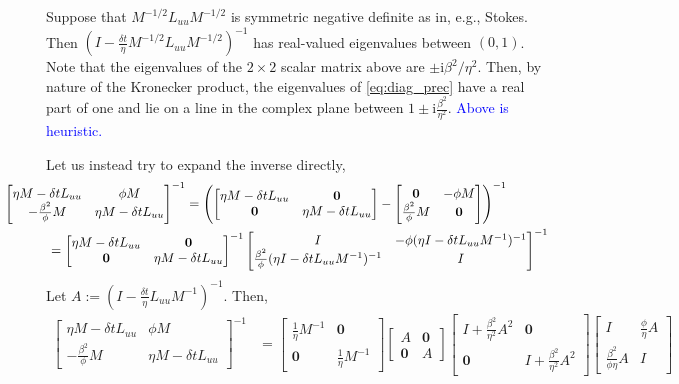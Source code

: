\documentclass[a4paper,10pt]{article}
\newcommand{\tcb}{\textcolor{blue}}
\begin{document}
%
Suppose that $M^{-1/2}L_{uu}M^{-1/2}$ is symmetric negative definite as in, e.g., Stokes.
Then $( I - \tfrac{\delta t}{\eta} M^{-1/2}L_{uu}M^{-1/2})^{-1}$ has real-valued
eigenvalues between $(0,1)$. Note that the eigenvalues of the $2\times 2$ scalar
matrix above are $\pm\mathrm{i}\beta^2/\eta^2$. Then, by nature of the Kronecker product,
the eigenvalues of \eqref{eq:diag_prec} have a real part of one and lie on a line in
the complex plane between $1\pm\mathrm{i}\frac{\beta^2}{\eta^2}$.
\tcb{Above is heuristic.}

Let us instead try to expand the inverse directly,
%
\begin{align*}
&\hspace{-8ex}\begin{bmatrix} \eta M - \delta tL_{uu} & \phi M \\
	-\frac{\beta^2}{\phi}M & \eta M - \delta tL_{uu} \end{bmatrix}^{-1}
= \left( 	\begin{bmatrix} \eta M - \delta tL_{uu} & \mathbf{0} \\
		\mathbf{0} & \eta M - \delta tL_{uu} \end{bmatrix} -
	\begin{bmatrix} \mathbf{0} & -\phi M \\
		\frac{\beta^2}{\phi}M & \mathbf{0} \end{bmatrix}\right)^{-1} \\
& = \begin{bmatrix} \eta M - \delta tL_{uu} & \mathbf{0} \\
		\mathbf{0} & \eta M - \delta tL_{uu} \end{bmatrix}^{-1}
	\begin{bmatrix} I & -\phi (\eta I - \delta tL_{uu}M^{-1})^{-1} \\
		\frac{\beta^2}{\phi}(\eta I - \delta tL_{uu}M^{-1})^{-1} & I \end{bmatrix}^{-1}
\end{align*}
%
Let $A := (I - \tfrac{\delta t}{\eta}L_{uu}M^{-1})^{-1}$. Then,
%
\begin{align*}
\begin{bmatrix} \eta M - \delta tL_{uu} & \phi M \\
	-\frac{\beta^2}{\phi}M & \eta M - \delta tL_{uu} \end{bmatrix}^{-1}
& = \begin{bmatrix} \frac{1}{\eta}M^{-1} & \mathbf{0} \\ \mathbf{0} & \frac{1}{\eta}M^{-1} \end{bmatrix}
	\begin{bmatrix} A & \mathbf{0} \\ \mathbf{0} & A \end{bmatrix} 
	\begin{bmatrix} I + \frac{\beta^2}{\eta^2}A^2 & \mathbf{0} \\ \mathbf{0} &
		I + \frac{\beta^2}{\eta^2}A^2 \end{bmatrix}
	\begin{bmatrix} I & \frac{\phi}{\eta}A \\ \frac{\beta^2}{\phi\eta}A & I \end{bmatrix}
\end{align*}
\end{document}
